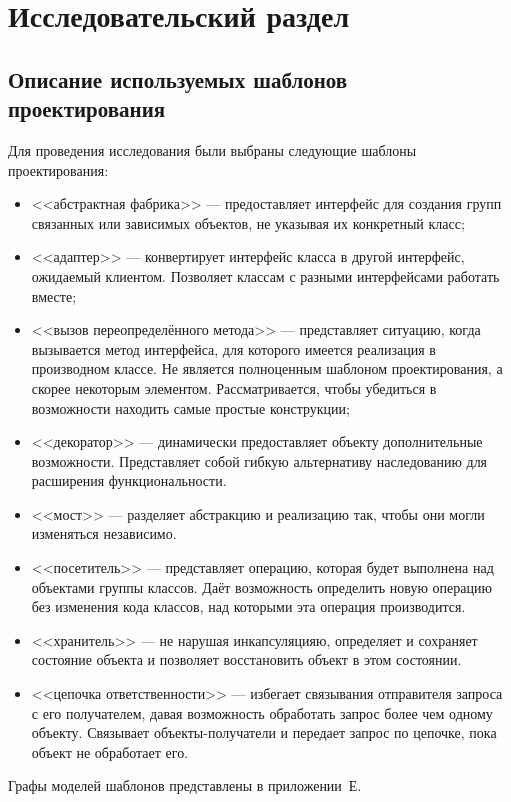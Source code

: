 \chapter{Исследовательский раздел}
\label{cha:research}

\section{Описание используемых шаблонов проектирования}

Для проведения исследования были выбраны следующие шаблоны проектирования:
\begin{itemize}
\item <<абстрактная фабрика>> --- предоставляет интерфейс для создания групп
связанных или зависимых объектов, не указывая их конкретный класс;
\item <<адаптер>> --- конвертирует интерфейс класса в другой интерфейс,
ожидаемый клиентом. Позволяет классам с разными интерфейсами работать вместе;
\item <<вызов переопределённого метода>> --- представляет ситуацию,
когда вызывается метод интерфейса,
для которого имеется реализация в производном классе.
Не является полноценным шаблоном проектирования, а скорее некоторым элементом.
Рассматривается, чтобы убедиться в возможности находить самые простые конструкции;
\item <<декоратор>> --- динамически предоставляет объекту дополнительные
возможности.
Представляет собой гибкую альтернативу наследованию для расширения
функциональности.
\item <<мост>> --- разделяет абстракцию и реализацию так,
чтобы они могли изменяться независимо.
\item <<посетитель>> --- представляет операцию, которая будет выполнена над
объектами группы классов.
Даёт возможность определить новую операцию без изменения кода классов,
над которыми эта операция производится.
\item <<хранитель>> --- не нарушая инкапсуляцияю, определяет и сохраняет
состояние объекта и позволяет восстановить объект в этом состоянии.
\item <<цепочка ответственности>> --- избегает связывания отправителя запроса с
его получателем, давая возможность обработать запрос более чем одному объекту.
Связывает объекты-получатели и передает запрос по цепочке, пока объект не
обработает его.
\end{itemize}

Графы моделей шаблонов представлены в приложении~Е.

